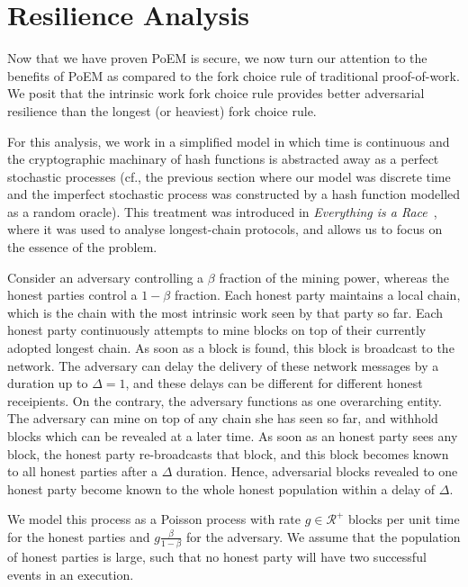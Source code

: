 \section{Resilience Analysis}

Now that we have proven PoEM is secure, we now turn our attention to the benefits of PoEM as compared to the
fork choice rule of traditional proof-of-work. We posit that the intrinsic work fork choice rule
provides better adversarial resilience than the longest (or heaviest) fork choice rule.

For this analysis, we work in a simplified model in which time is continuous
and the cryptographic machinary of hash functions is abstracted away as a perfect
stochastic processes (cf., the previous section where our model was discrete time
and the imperfect stochastic process was constructed by a hash function modelled as
a random oracle). This treatment was introduced in \emph{Everything is a Race}~\cite{eiar},
where it was used to analyse longest-chain protocols, and
allows us to focus on the essence of the problem.

Consider an adversary controlling a $\beta$ fraction of the mining power, whereas the
honest parties control a $1 - \beta$ fraction. Each honest party maintains a local chain,
which is the chain with the most intrinsic work seen by that party so far.
Each honest party continuously attempts to mine blocks on top of their currently
adopted longest chain. As soon as a block is found, this block is broadcast to the
network. The adversary can delay the delivery of these network messages by a duration
up to $\Delta = 1$, and these delays can be different for different honest receipients.
On the contrary, the adversary functions as one overarching entity.
The adversary can mine on top of any chain she has seen so far, and withhold blocks
which can be revealed at a later time. As soon as an honest party sees any
block, the honest party re-broadcasts that block, and this block becomes known to
all honest parties after a $\Delta$ duration. Hence, adversarial blocks revealed to one
honest party become known to the whole honest population within a delay of $\Delta$.

We model this process as a Poisson process with rate $g \in \mathcal{R}^+$ blocks per
unit time for the honest parties and $g \frac{\beta}{1 - \beta}$ for the adversary. We
assume that the population of honest parties is large, such that no honest party
will have two successful events in an execution.

